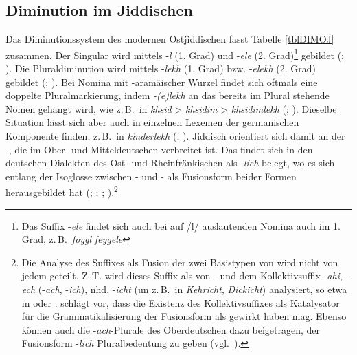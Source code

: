 \subsection{Diminution im Jiddischen}\label{dimJIDDISCH}

\largerpage[-2] 
Das Diminutionssystem des modernen Ostjiddischen fasst Tabelle  \ref{tblDIMOJ} zusammen. Der Singular wird mittels -\textit{l} (1. Grad) und -\textit{ele} (2. Grad)\footnote{Das Suffix -\textit{ele} findet sich auch bei auf /l/ auslautenden Nomina auch im 1. Grad, z.\,B.\,  
\textit{foygl}   
\textit{feygele} } gebildet (\citealt[69]{Jacobs2005}; \citealt[80]{Perlmutter1988}). Die Pluraldiminution wird mittels -\textit{lekh} (1. Grad) bzw. -\textit{elekh} (2. Grad) gebildet (\citealt[162–163]{Jacobs2005}; \citealt[80]{Perlmutter1988}). Bei Nomina mit -aramäischer  Wurzel findet sich oftmals eine doppelte  Pluralmarkierung, indem \textit{-(e)lekh} an das bereits im Plural stehende Nomen gehängt wird, wie z.\,B.\, in  \textit{khsid}  >  \textit{khsidim}  >  \textit{khsidimlekh}  (\citealt[163]{Jacobs2005}; \citealt{Perlmutter1988}). Dieselbe Situation lässt sich aber auch in einzelnen Lexemen der germanischen Komponente finden, z.\,B.\, in  \textit{kinderlekh}  (\citealt[163]{Jacobs2005}; \citealt{Perlmutter1988}). Jiddisch orientiert sich damit an der -, die im Ober- und Mitteldeutschen verbreitet ist. Das  findet sich in den deutschen Dialekten des Ost- und Rheinfränkischen als -\textit{lich} belegt, wo es sich entlang der Isoglosse zwischen - und - als Fusionsform beider Formen herausgebildet hat (\citealt[647]{Grimm1890}; \citealt[245]{Weinhold1867}; \citealt[124]{Wrede1908}; \citealt[49]{Paul1920}).\footnote{Die Analyse des Suffixes als Fusion der zwei Basistypen von  wird nicht von jedem geteilt. Z.\,T. wird dieses Suffix als  von - und dem Kollektivsuffix {\ahd} -\textit{ahi}, {\mhd} -\textit{ech} (-\textit{ach}, -\textit{ich}), nhd. -\textit{icht} (un z.\,B.\, in \textit{Kehricht}, \textit{Dickicht}) analysiert, so etwa in \cite[484]{Schirmunski1962} oder \cite[110–112]{Timm2005}. \cite[235]{Weinhold1867} schlägt vor, dass die Existenz des Kollektivsuffixes als Katalysator für die Grammatikalisierung der Fusionsform als  gewirkt haben mag. Ebenso können auch die -\textit{ach}-Plurale des Oberdeutschen dazu beigetragen, der Fusionsform -\textit{lich} Pluralbedeutung zu geben (vgl.\, \citealt{Rowley1994}).}\\ 



